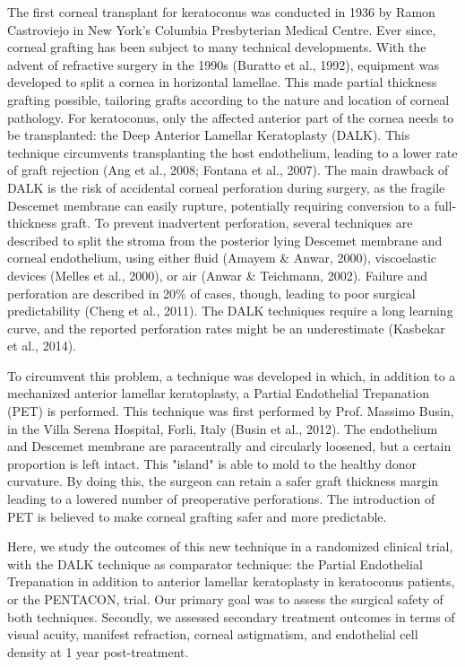 \documentclass[authordate, empirical,issue]{jote-new-article}
\begin{document}
	The first corneal transplant for keratoconus was conducted in 1936 by Ramon Castroviejo in New York's Columbia Presbyterian Medical Centre. Ever since, corneal grafting has been subject to many technical developments. With the advent of refractive surgery in the 1990s (Buratto et al., 1992), equipment was developed to split a cornea in horizontal lamellae. This made partial thickness grafting possible, tailoring grafts according to the nature and location of corneal pathology. For keratoconus, only the affected anterior part of the cornea needs to be transplanted: the Deep Anterior Lamellar Keratoplasty (DALK). This technique circumvents transplanting the host endothelium, leading to a lower rate of graft rejection (Ang et al., 2008; Fontana et al., 2007). The main drawback of DALK is the risk of accidental corneal perforation during surgery, as the fragile Descemet membrane can easily rupture, potentially requiring conversion to a full-thickness graft. To prevent inadvertent perforation, several techniques are described to split the stroma from the posterior lying Descemet membrane and corneal endothelium, using either fluid (Amayem \& Anwar, 2000), viscoelastic devices (Melles et al., 2000), or air (Anwar \& Teichmann, 2002). Failure and perforation are described in 20\% of cases, though, leading to poor surgical predictability (Cheng et al., 2011). The DALK techniques require a long learning curve, and the reported perforation rates might be an underestimate (Kasbekar et al., 2014).



	To circumvent this problem, a technique was developed in which, in addition to a mechanized anterior lamellar keratoplasty, a Partial Endothelial Trepanation (PET) is performed. This technique was first performed by Prof. Massimo Busin, in the Villa Serena Hospital, Forli, Italy (Busin et al., 2012).\textsuperscript{ }The endothelium and Descemet membrane are paracentrally and circularly loosened, but a certain proportion is left intact. This "island" is able to mold to the healthy donor curvature. By doing this, the surgeon can retain a safer graft thickness margin leading to a lowered number of preoperative perforations. The introduction of PET is believed to make corneal grafting safer and more predictable.



	Here, we study the outcomes of this new technique in a randomized clinical trial, with the DALK technique as comparator technique: the Partial Endothelial Trepanation in addition to anterior lamellar keratoplasty in keratoconus patients, or the PENTACON, trial. Our primary goal was to assess the surgical safety of both techniques. Secondly, we assessed secondary treatment outcomes in terms of visual acuity, manifest refraction, corneal astigmatism, and endothelial cell density at 1 year post-treatment.
\end{document}
